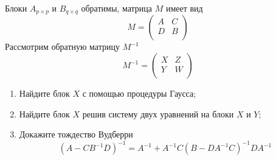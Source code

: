 \begin{problem}
    Блоки $A_{p\times p}$ и $B_{q\times q}$ обратимы, матрица $M$ имеет вид
    \[
      M = \begin{pmatrix}
	A & C \\
	D & B \\
      \end{pmatrix}
    \]
    Рассмотрим обратную матрицу $M^{-1}$
    \[
      M^{-1} = \begin{pmatrix}
	X & Z \\
	Y & W \\
      \end{pmatrix}
    \]
    \begin{enumerate}
      \item Найдите блок $X$ с помощью процедуры Гаусса;
      \item Найдите блок $X$ решив систему двух уравнений на блоки $X$ и $Y$;
      \item Докажите тождество Вудберри
      \[
      (A - CB^{-1}D)^{-1}  =  A^{-1} + A^{-1}C(B - DA^{-1}C)^{-1}DA^{-1}
      \]
    \end{enumerate}


\end{problem}
